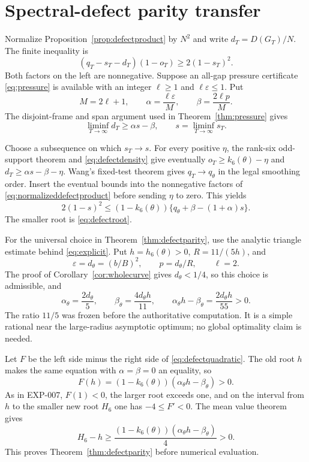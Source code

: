 ﻿\documentclass[11pt]{article}
\theoremstyle{remark}
\begin{document}
\section{Spectral-defect parity transfer}
\label{sec:defecttransfer}

Normalize Proposition~\ref{prop:defectproduct} by $N^2$ and write
$d_T=D(G_T)/N$. The finite inequality is
\begin{equation}\label{eq:normalizeddefectproduct}
 (q_T-s_T-d_T)(1-o_T)\ge2(1-s_T)^2.
\end{equation}
Both factors on the left are nonnegative. Suppose an all-gap pressure
certificate \eqref{eq:pressure} is available with an integer $\ell\ge1$ and
$\ell\varepsilon\le1$. Put
\[
 M=2\ell+1,
 \qquad \alpha=\frac{\ell\varepsilon}{M},
 \qquad \beta=\frac{2\ell p}{M}.
\]
The disjoint-frame and span argument used in Theorem~\ref{thm:pressure} gives
\begin{equation}\label{eq:defectdensity}
 \liminf_{T\to\infty}d_T\ge\alpha s-\beta,
 \qquad s=\liminf_{T\to\infty}s_T.
\end{equation}

Choose a subsequence on which $s_T\to s$. For every positive $\eta$, the
rank-six odd-support theorem and \eqref{eq:defectdensity} give eventually
$o_T\ge k_6(\theta)-\eta$ and
$d_T\ge\alpha s-\beta-\eta$. Wang's fixed-test theorem gives
$q_T\to q_\theta$ in the legal smoothing order. Insert the eventual bounds
into the nonnegative factors of \eqref{eq:normalizeddefectproduct} before
sending $\eta$ to zero. This yields
\begin{equation}\label{eq:defectquadratic}
 2(1-s)^2\le(1-k_6(\theta))
 \{q_\theta+\beta-(1+\alpha)s\}.
\end{equation}
The smaller root is \eqref{eq:defectroot}.

For the universal choice in Theorem~\ref{thm:defectparity}, use the analytic
triangle estimate behind \eqref{eq:explicit}. Put $h=h_6(\theta)>0$,
$R=11/(5h)$, and
\[
 \varepsilon=d_\theta=(b/B)^2,
 \qquad p=d_\theta/R,
 \qquad \ell=2.
\]
The proof of Corollary~\ref{cor:wholecurve} gives $d_\theta<1/4$, so this
choice is admissible, and
\[
 \alpha_\theta=\frac{2d_\theta}{5},
 \qquad \beta_\theta=\frac{4d_\theta h}{11},
 \qquad \alpha_\theta h-\beta_\theta
 =\frac{2d_\theta h}{55}>0.
\]
The ratio $11/5$ was frozen before the authoritative computation. It is a
simple rational near the large-radius asymptotic optimum; no global optimality
claim is needed.

Let $F$ be the left side minus the right side of
\eqref{eq:defectquadratic}. The old root $h$ makes the same equation with
$\alpha=\beta=0$ an equality, so
\[
 F(h)=(1-k_6(\theta))(\alpha_\theta h-\beta_\theta)>0.
\]
As in EXP-007, $F(1)<0$, the larger root exceeds one, and on the interval from
$h$ to the smaller new root $H_6$ one has $-4\le F'<0$. The mean value theorem
gives
\[
 H_6-h\ge\frac{(1-k_6(\theta))
 (\alpha_\theta h-\beta_\theta)}4>0.
\]
This proves Theorem~\ref{thm:defectparity} before numerical evaluation.
\end{document}
